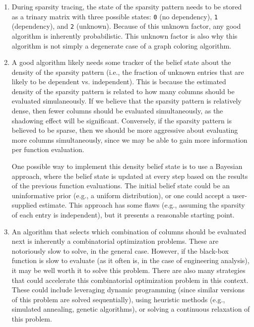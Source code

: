 \begin{enumerate}
    \item During sparsity tracing, the state of the sparsity pattern needs to be stored as a trinary matrix with three possible states: \texttt{0} (no dependency), \texttt{1} (dependency), and \texttt{2} (unknown). Because of this unknown factor, any good algorithm is inherently probabilistic. This unknown factor is also why this algorithm is not simply a degenerate case of a graph coloring algorithm.
    \item A good algorithm likely needs some tracker of the belief state about the density of the sparsity pattern (i.e., the fraction of unknown entries that are likely to be dependent vs. independent). This is because the estimated density of the sparsity pattern is related to how many columns should be evaluated simulaneously. If we believe that the sparsity pattern is relatively dense, then fewer columns should be evaluated simultaneously, as the shadowing effect will be significant. Conversely, if the sparsity pattern is believed to be sparse, then we should be more aggressive about evaluating more columns simultaneously, since we may be able to gain more information per function evaluation.

    One possible way to implement this density belief state is to use a Bayesian approach, where the belief state is updated at every step based on the results of the previous function evaluations. The initial belief state could be an uninformative prior (e.g., a uniform distribution), or one could accept a user-supplied estimate. This approach has some flaws (e.g., assuming the sparsity of each entry is independent), but it presents a reasonable starting point.

    \item An algorithm that selects which combination of columns should be evaluated next is inherently a combinatorial optimization problems. These are notoriously slow to solve, in the general case. However, if the black-box function is slow to evaluate (as it often is, in the case of engineering analysis), it may be well worth it to solve this problem. There are also many strategies that could accelerate this combinatorial optimization problem in this context. These could include leveraging dynamic programming (since similar versions of this problem are solved sequentially), using heuristic methods (e.g., simulated annealing, genetic algorithms), or solving a continuous relaxation of this problem.


\end{enumerate}
